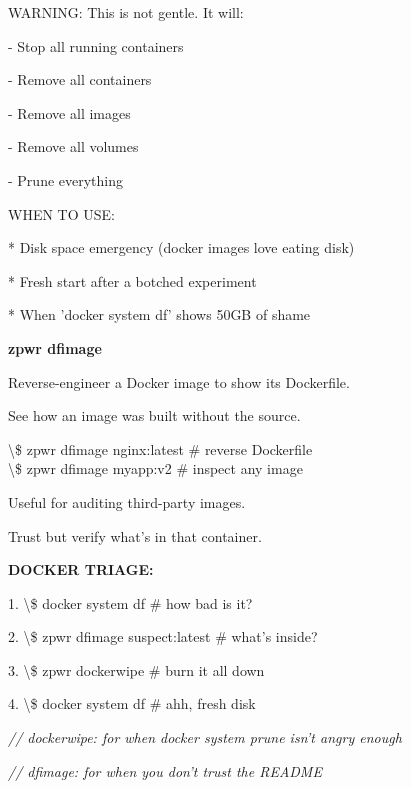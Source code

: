 \documentclass[11pt,a4paper,twoside]{book}
\begin{document}
WARNING: This is not gentle. It will:

- Stop all running containers

- Remove all containers

- Remove all images

- Remove all volumes

- Prune everything

WHEN TO USE:

* Disk space emergency (docker images love eating disk)

* Fresh start after a botched experiment

* When 'docker system df' shows 50GB of shame


\vspace{12pt}
{\bfseries\color{neonyellow} zpwr dfimage}\vspace{4pt}

Reverse-engineer a Docker image to show its Dockerfile.

See how an image was built without the source.

\begin{codebox}
\textbackslash{}\$ zpwr dfimage nginx:latest   \# reverse Dockerfile\\
\textbackslash{}\$ zpwr dfimage myapp:v2       \# inspect any image\\
\end{codebox}

Useful for auditing third-party images.

Trust but verify what's in that container.


\vspace{12pt}
{\bfseries\color{neonyellow} DOCKER TRIAGE:}\vspace{4pt}

1. \textbackslash{}\$ docker system df              \# how bad is it?

2. \textbackslash{}\$ zpwr dfimage suspect:latest   \# what's inside?

3. \textbackslash{}\$ zpwr dockerwipe               \# burn it all down

4. \textbackslash{}\$ docker system df              \# ahh, fresh disk

{\small\itshape\color{dimtext} // dockerwipe: for when docker system prune isn't angry enough}

{\small\itshape\color{dimtext} // dfimage: for when you don't trust the README}


\vspace{16pt}
\end{document}
